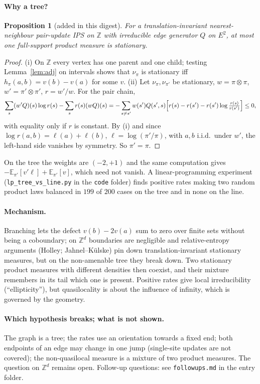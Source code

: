 \documentclass[11pt]{article}
\newtheorem{proposition}[theorem]{Proposition}
\newcommand{\Z}{\mathbb{Z}}
\begin{document}
\paragraph{Why a tree?}
\begin{proposition}[added in this digest]
For a translation-invariant nearest-neighbour pair-update IPS on $\Z$ with irreducible edge generator $Q$ on $E^2$, at most one full-support product measure is stationary.
\end{proposition}
\begin{proof}
(i) On $\Z$ every vertex has one parent and one child; testing Lemma~\ref{lem:adj} on intervals shows that $\nu_\pi$ is stationary iff $h_\pi(a,b)=v(b)-v(a)$ for some $v$.
(ii) Let $\nu_\pi,\nu_{\pi'}$ be stationary, $w=\pi\otimes\pi$, $w'=\pi'\otimes\pi'$, $r=w'/w$. For the pair chain,
\[
\sum_s(w'Q)(s)\log r(s)-\sum_s r(s)(wQ)(s)=-\sum_{s\ne s'}w(s')Q(s',s)\Bigl[r(s)-r(s')-r(s')\log\tfrac{r(s)}{r(s')}\Bigr]\le0,
\]
with equality only if $r$ is constant. By (i) and since $\log r(a,b)=\ell(a)+\ell(b)$, $\ell=\log(\pi'/\pi)$, with $a,b$ i.i.d.\ under $w'$, the left-hand side vanishes by symmetry. So $\pi'=\pi$.
\end{proof}
On the tree the weights are $(-2,+1)$ and the same computation gives $-\mathbb E_{\pi'}[v'\ell]+\mathbb E_{\pi'}[v]$, which need not vanish. A linear-programming experiment (\texttt{lp\_tree\_vs\_line.py} in the \texttt{code} folder) finds positive rates making two random product laws balanced in $199$ of $200$ cases on the tree and in none on the line.

\paragraph{Mechanism.} Branching lets the defect $v(b)-2v(a)$ sum to zero over finite sets without being a coboundary; on $\Z^d$ boundaries are negligible and relative-entropy arguments (Holley; Jahnel--K\"ulske) pin down translation-invariant stationary measures, but on the non-amenable tree they break down. Two stationary product measures with different densities then coexist, and their mixture remembers in its tail which one is present. Positive rates give local irreducibility (``ellipticity''), but quasilocality is about the influence of infinity, which is governed by the geometry.

\paragraph{Which hypothesis breaks; what is not shown.} The graph is a tree; the rates use an orientation towards a fixed end; both endpoints of an edge may change in one jump (single-site updates are not covered); the non-quasilocal measure is a mixture of two product measures. The question on $\Z^d$ remains open. Follow-up questions: see \texttt{followups.md} in the entry folder.
\end{document}
